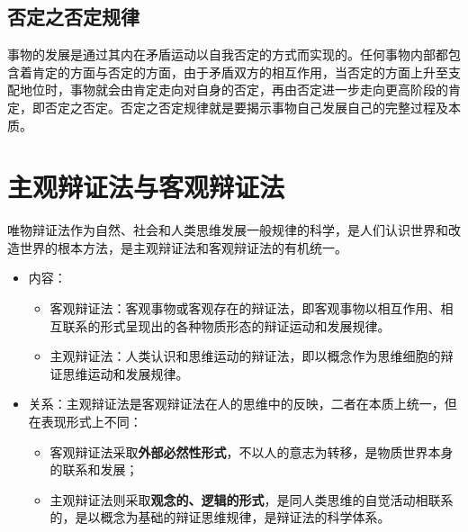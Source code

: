 \documentclass[12pt,openany]{ctexbook}
\begin{document}
\subsection{否定之否定规律}
事物的发展是通过其内在矛盾运动以自我否定的方式而实现的。任何事物内部都包含着肯定的方面与否定的方面，由于矛盾双方的相互作用，当否定的方面上升至支配地位时，事物就会由肯定走向对自身的否定，再由否定进一步走向更高阶段的肯定，即否定之否定。否定之否定规律就是要揭示事物自己发展自己的完整过程及本质。
\section{主观辩证法与客观辩证法}
唯物辩证法作为自然、社会和人类思维发展一般规律的科学，是人们认识世界和改造世界的根本方法，是主观辩证法和客观辩证法的有机统一。
\begin{itemize}
  \item 内容：
\begin{itemize}
  \item 客观辩证法：客观事物或客观存在的辩证法，即客观事物以相互作用、相互联系的形式呈现出的各种物质形态的辩证运动和发展规律。
  \item 主观辩证法：人类认识和思维运动的辩证法，即以概念作为思维细胞的辩证思维运动和发展规律。
\end{itemize}
  \item 关系：主观辩证法是客观辩证法在人的思维中的反映，二者在本质上统一，但在表现形式上不同：
\begin{itemize}
  \item 客观辩证法采取\textbf{外部必然性形式}，不以人的意志为转移，是物质世界本身的联系和发展；
  \item 主观辩证法则采取\textbf{观念的、逻辑的形式}，是同人类思维的自觉活动相联系的，是以概念为基础的辩证思维规律，是辩证法的科学体系。
\end{itemize}
\end{itemize}
\end{document}

